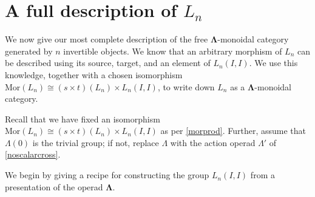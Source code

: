 \documentclass{amsbook} %
\newcommand{\ML}{\mathbf{\Lambda}}
\newcommand{\MorLn}{\mathrm{Mor}(L_n)}
\numberwithin{section}{chapter}
\begin{document}
\section{A full description of \texorpdfstring{$L_n$}{L_n}}\label{full_des}

We now give our most complete description of the free $\ML$-monoidal category generated by $n$ invertible objects. We know that an arbitrary morphism of $L_n$ can be described using its source, target, and an element of $L_n(I,I)$. We use this knowledge, together with a chosen isomorphism $\MorLn \cong (s \times t)(L_n) \times L_n(I,I)$, to write down $L_n$ as a $\ML$-monoidal category.

\begin{conv}
Recall that we have fixed an isomorphism $\MorLn \cong (s \times t)(L_n) \times L_n(I,I)$ as per \cref{morprod}. Further, assume that $\Lambda(0)$ is the trivial group; if not, replace $\Lambda$ with the action operad $\Lambda'$ of \cref{noscalarcross}.
\end{conv}

We begin by giving a recipe for constructing the group $L_n(I,I)$ from a presentation of the operad $\ML$.
\end{document}
